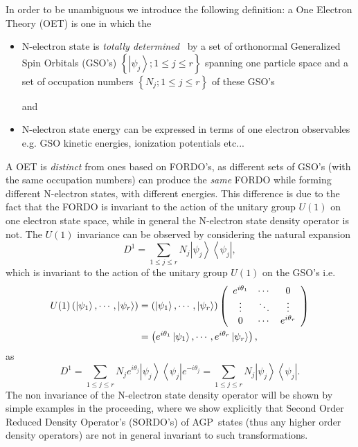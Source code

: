 \documentclass[aps,preprint]{revtex4}%
\begin{document}
In order to be unambiguous we introduce the following definition: a One
Electron Theory (OET) is one in which the

\begin{itemize}
\item N-electron state is \emph{totally determined} \ by a set of orthonormal
Generalized Spin Orbitals (GSO's) $\left\{  \left\vert \psi_{j}\right\rangle
;1\leq j\leq r\right\}  $ spanning one particle space and a set of occupation
numbers $\left\{  N_{j};1\leq j\leq r\right\}  $ of these GSO's

and

\item N-electron state energy can be expressed in terms of one electron
observables e.g. GSO kinetic energies, ionization potentials etc...
\end{itemize}

A OET is \emph{distinct} from ones based on FORDO's, as different sets of
GSO's (with the same occupation numbers) can produce the \emph{same} FORDO
while forming different N-electron states, with different energies. This
difference is due to the fact that the FORDO is invariant to the action of the
unitary group $U(1)$ on one electron state space, while in general the
N-electron state density operator is not. The $U(1)$ invariance can be
observed by considering the natural expansion
\begin{equation}
D^{1}=\sum_{1\leq j\leq r}N_{j}\left\vert \psi_{j}\right\rangle \left\langle
\psi_{j}\right\vert ,
\end{equation}
which is invariant to the action of the unitary group $U(1)$ on the GSO's i.e.%
\begin{align}
U(1)\left(  \left\vert \psi_{1}\right\rangle ,\cdots,\left\vert \psi
_{r}\right\rangle \right)   &  =\left(  \left\vert \psi_{1}\right\rangle
,\cdots,\left\vert \psi_{r}\right\rangle \right)  \left(
\begin{array}
[c]{ccc}%
e^{i\theta_{1}} & \cdots & 0\\
\vdots & \ddots & \vdots\\
0 & \cdots & e^{i\theta_{r}}%
\end{array}
\right) \nonumber\\
&  =\left(  e^{i\theta_{1}}\left\vert \psi_{1}\right\rangle ,\cdots
,e^{i\theta_{r}}\left\vert \psi_{r}\right\rangle \right)  ,
\end{align}
as%
\begin{equation}
D^{1}=\sum_{1\leq j\leq r}N_{j}e^{i\theta_{j}}\left\vert \psi_{j}\right\rangle
\left\langle \psi_{j}\right\vert e^{-i\theta_{j}}=\sum_{1\leq j\leq r}%
N_{j}\left\vert \psi_{j}\right\rangle \left\langle \psi_{j}\right\vert .
\end{equation}
The non invariance of the N-electron state density operator will be shown by
simple examples in the proceeding, where we show explicitly that Second Order
Reduced Density Operator's (SORDO's) of AGP\ states (thus any higher order
density operators) are not in general invariant to such transformations.
\end{document}
